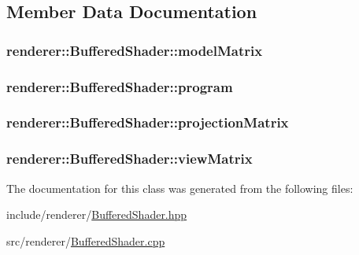 \subsection{Member Data Documentation}
\hypertarget{classrenderer_1_1BufferedShader_aa175bba81d65338665fb4dce482ff79f}{
\subsubsection[{model\-Matrix}]{ renderer\-::\-Buffered\-Shader\-::model\-Matrix}}\label{classrenderer_1_1BufferedShader_aa175bba81d65338665fb4dce482ff79f}
\hypertarget{classrenderer_1_1BufferedShader_a8340ac0abf09edfc413a0d74f9e7219a}{
\subsubsection[{program}]{ renderer\-::\-Buffered\-Shader\-::program}}\label{classrenderer_1_1BufferedShader_a8340ac0abf09edfc413a0d74f9e7219a}
\hypertarget{classrenderer_1_1BufferedShader_a1c45e50823222aa1fe77f4d8408089b7}{
\subsubsection[{projection\-Matrix}]{ renderer\-::\-Buffered\-Shader\-::projection\-Matrix}}\label{classrenderer_1_1BufferedShader_a1c45e50823222aa1fe77f4d8408089b7}
\hypertarget{classrenderer_1_1BufferedShader_aaadf5b2d4842e8dc06cddc36369622d6}{
\subsubsection[{view\-Matrix}]{ renderer\-::\-Buffered\-Shader\-::view\-Matrix}}\label{classrenderer_1_1BufferedShader_aaadf5b2d4842e8dc06cddc36369622d6}


The documentation for this class was generated from the following files\-:\begin{DoxyCompactItemize}
\item 
include/renderer/\hyperlink{BufferedShader_8hpp}{Buffered\-Shader.\-hpp}\item 
src/renderer/\hyperlink{BufferedShader_8cpp}{Buffered\-Shader.\-cpp}\end{DoxyCompactItemize}
